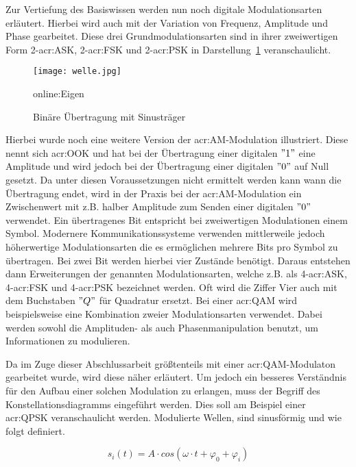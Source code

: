 Zur Vertiefung des Basiswissen werden nun noch digitale Modulationsarten erläutert. Hierbei wird auch mit der Variation von Frequenz, Amplitude und Phase gearbeitet. Diese drei Grundmodulationsarten sind in ihrer zweiwertigen Form 2-\gls{acr:ASK}, 2-\gls{acr:FSK} und 2-\gls{acr:PSK} in Darstellung~\ref{fig:welle} veranschaulicht.

\begin{figure}[H]
	\centering
	\texttt{[image: welle.jpg]}
	\caption[Binäre Übertragung mit Sinusträger]{Binäre Übertragung mit Sinusträger} 
	\cite{NT}\gls{online:Eigen}
	\label{fig:welle}
\end{figure}

Hierbei wurde noch eine weitere Version der \gls{acr:AM}-Modulation illustriert. Diese nennt sich \gls{acr:OOK} und hat bei der Übertragung einer digitalen $"1"$ eine Amplitude und wird jedoch bei der Übertragung einer digitalen $"0"$ auf Null gesetzt. Da unter diesen Voraussetzungen nicht ermittelt werden kann wann die Übertragung endet, wird in der Praxis bei der \gls{acr:AM}-Modulation ein Zwischenwert mit z.B. halber Amplitude zum Senden einer digitalen $"0"$ verwendet. Ein übertragenes Bit entspricht bei zweiwertigen Modulationen einem Symbol. Modernere Kommunikationssysteme verwenden mittlerweile jedoch höherwertige Modulationsarten die es ermöglichen mehrere Bits pro Symbol zu übertragen. Bei zwei Bit werden hierbei vier Zustände benötigt. Daraus entstehen dann Erweiterungen der genannten Modulationsarten, welche z.B. als 4-\gls{acr:ASK}, 4-\gls{acr:FSK} und 4-\gls{acr:PSK} bezeichnet werden. Oft wird die Ziffer Vier auch mit dem Buchstaben $"Q"$ für Quadratur ersetzt.\cite{howwireless}\cite{butlerWirelessNetworkingDeveloping2013} Bei einer \gls{acr:QAM} wird beispielsweise eine Kombination zweier Modulationsarten verwendet. Dabei werden sowohl die Amplituden- als auch Phasenmanipulation benutzt, um Informationen zu modulieren. 

Da im Zuge dieser Abschlussarbeit größtenteils mit einer \gls{acr:QAM}-Modulaton gearbeitet wurde, wird diese näher erläutert. Um jedoch ein besseres Verständnis für den Aufbau einer solchen Modulation zu erlangen, muss der Begriff des Konstellationsdiagramms eingeführt werden. Dies soll am Beispiel einer \gls{acr:QPSK} veranschaulicht werden. Modulierte Wellen, sind sinusförmig und wie folgt definiert. 

\begin{equation}
	\label{equ:qpsk}
	s_{i}(t) = A \cdot cos(\omega \cdot t+\varphi_{0}+\varphi_{i})
\end{equation}

